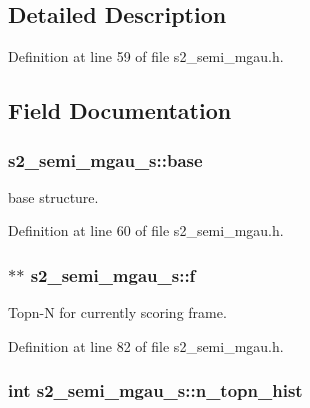 \subsection{\-Detailed \-Description}


\-Definition at line 59 of file s2\-\_\-semi\-\_\-mgau.\-h.



\subsection{\-Field \-Documentation}
\subsubsection[{base}]{ {\bf s2\-\_\-semi\-\_\-mgau\-\_\-s\-::base}}\label{structs2__semi__mgau__s_a9002aae86249006f0b045e5203ec9687}


base structure. 



\-Definition at line 60 of file s2\-\_\-semi\-\_\-mgau.\-h.

\subsubsection[{f}]{$\ast$$\ast$ {\bf s2\-\_\-semi\-\_\-mgau\-\_\-s\-::f}}\label{structs2__semi__mgau__s_ad8cb7f058bcc7402dd6a41c61f1b26e5}


\-Topn-\/\-N for currently scoring frame. 



\-Definition at line 82 of file s2\-\_\-semi\-\_\-mgau.\-h.

\subsubsection[{n\-\_\-topn\-\_\-hist}]{\setlength{\rightskip}{0pt plus 5cm}int {\bf s2\-\_\-semi\-\_\-mgau\-\_\-s\-::n\-\_\-topn\-\_\-hist}}\label{structs2__semi__mgau__s_a3cbc9fe683da5b7befe6b2712adae327}


